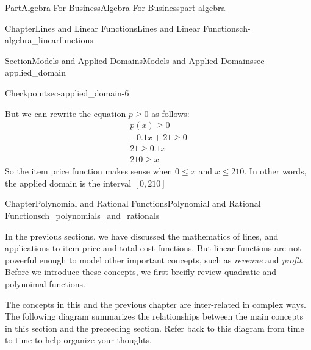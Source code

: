 \documentclass{tufte-book}
\numberwithin{equation}{chapter}
\begin{document}
\begin{partptx}{Part}{Algebra For Business}{}{Algebra For Business}{}{}{part-algebra}
\begin{chapterptx}{Chapter}{Lines and Linear Functions}{}{Lines and Linear Functions}{}{}{ch-algebra_linearfunctions}
\begin{sectionptx}{Section}{Models and Applied Domains}{}{Models and Applied Domains}{}{}{sec-applied_domain}
\begin{inlineexercise}{Checkpoint}{}{sec-applied_domain-6}
\par
But we can rewrite the equation \(p\geq 0\) as follows:%
\begin{gather*}
p(x) \geq 0 \\
-0.1x + 21 \geq 0\\
21 \geq 0.1x\\
210 \geq x
\end{gather*}
So the item price function makes sense when \(0\leq x\) and \(x\leq 210\).  In other words, the applied domain is the interval \([0,210]\)%
\end{inlineexercise}%
\end{sectionptx}
\end{chapterptx}
%
\typeout{************************************************}
\typeout{************************************************}
%
\begin{chapterptx}{Chapter}{Polynomial and Rational Functions}{}{Polynomial and Rational Functions}{}{}{ch_polynomials_and_rationals}
\renewcommand*{\chaptername}{Chapter}
\begin{introduction}{}%
In the previous sections, we have discussed the mathematics of lines, and applications to item price and total cost functions. But linear functions are not powerful enough to model other important concepts, such as \emph{revenue} and \emph{profit}. Before we introduce these concepts, we first breifly review quadratic and polynoimal functions.%
\par
The concepts in this and the previous chapter are inter-related in complex ways.  The following diagram summarizes the relationships between the main concepts in this section and the preceeding section.  Refer back to this diagram from time to time to help organize your thoughts.%
\begin{image}{0}{1}{0}{}%
\end{image}
\end{introduction}
\end{chapterptx}
\end{partptx}
\end{document}
